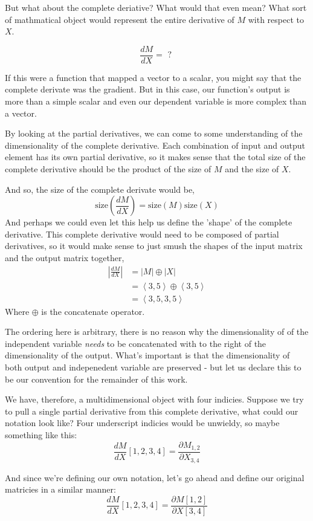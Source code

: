 \documentclass[12pt]{article}
\theoremstyle{definition}
\theoremstyle{plain}
\theoremstyle{ppart}
\begin{document}
\noindent
But what about the complete deriative? What would that even mean? What sort of
mathmatical object would represent the entire derivative of $M$ with respect to $X$.

\[\frac{dM}{dX} = \mbox{ ? }\]

If this were a function that mapped a vector to a scalar, you might say that the
complete derivate was the gradient. But in this case, our function's output is more
than a simple scalar and even our dependent variable is more complex than a vector.

By looking at the partial derivatives, we can come to some understanding of the
dimensionality of the complete derivative. Each combination of input and output
element has its own partial derivative, so it makes sense that the total size
of the complete derivative should be the product of the size of $M$ and the size
of $X$.

And so, the size of the complete derivate would be,
\[
\mbox{size}\left(\frac{dM}{dX}\right) = \mbox{size}(M) \mbox{size}(X)
\]
And perhaps we could even let this help us define the 'shape' of the complete
derivative. This complete derivative would need to be composed of partial
derivatives, so it would make sense to just smush the shapes of the input
matrix and the output matrix together,
\begin{align*}
\left|\frac{dM}{dX}\right| &= |M| \oplus |X| \\
 &= \left< 3, 5 \right> \oplus \left< 3, 5 \right> \\
 &= \left< 3, 5, 3, 5 \right>
\end{align*}
Where $\oplus$ is the concatenate operator.

The ordering here is arbitrary, there is no reason why the dimensionality of
of the independent variable \textit{needs} to be concatenated with to the right of the
dimensionality of the output. What's important is that the dimensionality of
both output and indepenedent variable are preserved - but let us declare this to
be our convention for the remainder of this work.

We have, therefore, a multidimensional object with four indicies. Suppose we try to
pull a single partial derivative from this complete derivative, what could our
notation look like? Four underscript indicies would be unwieldy, so maybe something
like this:
\[
\frac{dM}{dX}[1,2,3,4] = \frac{\partial M_{1,2}}{\partial X_{3,4}}
\]

And since we're defining our own notation, let's go ahead and define our original
matricies in a similar manner:
\[
\frac{dM}{dX}[1,2,3,4] = \frac{\partial M[1,2]}{\partial X[3,4]}
\]
\end{document}
